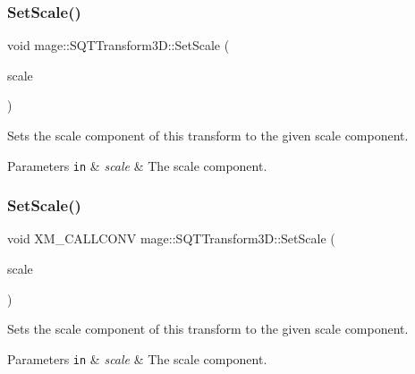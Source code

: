 \subsubsection{\texorpdfstring{Set\+Scale()}{SetScale()}\hspace{0.1cm}{\footnotesize\ttfamily [3/4]}}
{\footnotesize\ttfamily void mage\+::\+S\+Q\+T\+Transform3\+D\+::\+Set\+Scale (\begin{DoxyParamCaption}\item[{\mbox{\hyperlink{namespacemage_a1e3c7a882af461f161caa1cbddaf1fa2}{F32x3}}}]{scale }\end{DoxyParamCaption})\hspace{0.3cm}{\ttfamily [noexcept]}}

Sets the scale component of this transform to the given scale component.


\begin{DoxyParams}[1]{Parameters}
\mbox{\tt in}  & {\em scale} & The scale component. \\
\hline
\end{DoxyParams}
\mbox{\label{classmage_1_1_s_q_t_transform3_d_aa66a0de13a87880e5eafb2999ada9cf1}} 
\subsubsection{\texorpdfstring{Set\+Scale()}{SetScale()}\hspace{0.1cm}{\footnotesize\ttfamily [4/4]}}
{\footnotesize\ttfamily void X\+M\+\_\+\+C\+A\+L\+L\+C\+O\+NV mage\+::\+S\+Q\+T\+Transform3\+D\+::\+Set\+Scale (\begin{DoxyParamCaption}\item[{F\+X\+M\+V\+E\+C\+T\+OR}]{scale }\end{DoxyParamCaption})\hspace{0.3cm}{\ttfamily [noexcept]}}

Sets the scale component of this transform to the given scale component.


\begin{DoxyParams}[1]{Parameters}
\mbox{\tt in}  & {\em scale} & The scale component. \\
\hline
\end{DoxyParams}
\mbox{\label{classmage_1_1_s_q_t_transform3_d_a02ad0bda32f6f6dbee8c085133404c5e}} 
